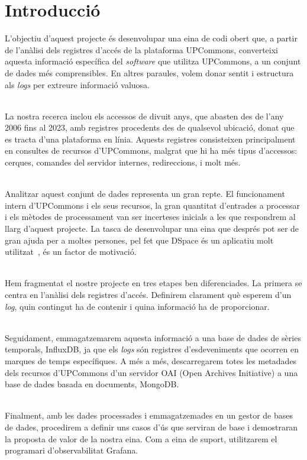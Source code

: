 \chapter*{Introducció}\label{ch:introduction}

L'objectiu d'aquest projecte és desenvolupar una eina de codi obert que, a partir de l'anàlisi dels registres d'accés de la plataforma \gls{UPCommons}, converteixi aquesta informació específica del \textit{software} que utilitza \gls{UPCommons}, a un conjunt de dades més comprensibles.
En altres paraules, volem donar sentit i estructura als \textit{\gls{log}s} per extreure informació valuosa.

\noindent \\
La nostra recerca inclou els accessos de divuit anys, que abasten des de l'any 2006 fins al 2023, amb registres procedents des de qualsevol ubicació, donat que es tracta d'una plataforma en línia.
Aquests registres consisteixen principalment en consultes de recursos d'\gls{UPCommons}, malgrat que hi ha més tipus d'accessos: cerques, comandes del servidor internes, redireccions, i molt més.

\noindent \\
Analitzar aquest conjunt de dades representa un gran repte.
El funcionament intern d'\gls{UPCommons} i els seus recursos, la gran quantitat d'entrades a processar i els mètodes de processament van ser incerteses inicials a les que respondrem al llarg d'aquest projecte.
La tasca de desenvolupar una eina que després pot ser de gran ajuda per a moltes persones, pel fet que \gls{DSpace} és un aplicatiu molt utilitzat~\cite{eprints:roar}, és un factor de motivació.

\noindent \\
Hem fragmentat el nostre projecte en tres etapes ben diferenciades.
La primera se centra en l'anàlisi dels registres d'accés.
Definirem clarament què esperem d'un \textit{\gls{log}}, quin contingut ha de contenir i quina informació ha de proporcionar.

\noindent \\
Seguidament, emmagatzemarem aquesta informació a una base de dades de sèries temporals, InfluxDB, ja que els \textit{\gls{log}s} són registres d'esdeveniments que ocorren en marques de temps específiques.
A més a més, descarregarem totes les metadades dels recursos d'\gls{UPCommons} d'un servidor OAI (Open Archives Initiative) a una base de dades basada en documents, MongoDB.

\noindent \\
Finalment, amb les dades processades i emmagatzemades en un gestor de bases de dades, procedirem a definir uns casos d'ús que serviran de base i demostraran la proposta de valor de la nostra eina.
Com a eina de suport, utilitzarem el programari d'observabilitat Grafana.


